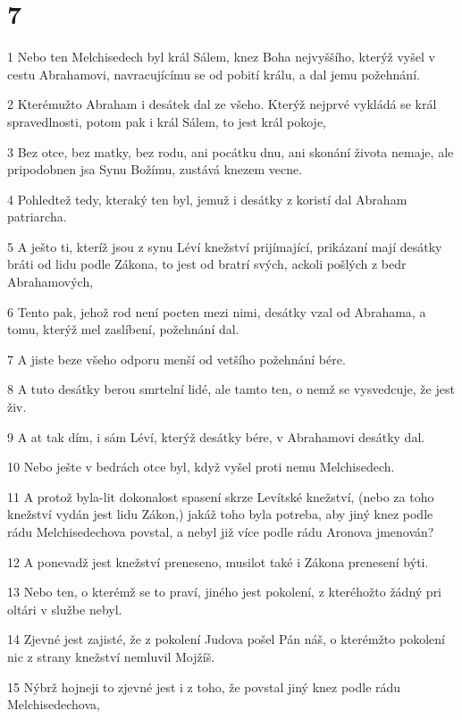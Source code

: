\chapter{7}

\par 1 Nebo ten Melchisedech byl král Sálem, knez Boha nejvyššího, kterýž vyšel v cestu Abrahamovi, navracujícímu se od pobití králu, a dal jemu požehnání.
\par 2 Kterémužto Abraham i desátek dal ze všeho. Kterýž nejprvé vykládá se král spravedlnosti, potom pak i král Sálem, to jest král pokoje,
\par 3 Bez otce, bez matky, bez rodu, ani pocátku dnu, ani skonání života nemaje, ale pripodobnen jsa Synu Božímu, zustává knezem vecne.
\par 4 Pohledtež tedy, kteraký ten byl, jemuž i desátky z koristí dal Abraham patriarcha.
\par 5 A ješto ti, kteríž jsou z synu Léví knežství prijímající, prikázaní mají desátky bráti od lidu podle Zákona, to jest od bratrí svých, ackoli pošlých z bedr Abrahamových,
\par 6 Tento pak, jehož rod není pocten mezi nimi, desátky vzal od Abrahama, a tomu, kterýž mel zaslíbení, požehnání dal.
\par 7 A jiste beze všeho odporu menší od vetšího požehnání bére.
\par 8 A tuto desátky berou smrtelní lidé, ale tamto ten, o nemž se vysvedcuje, že jest živ.
\par 9 A at tak dím, i sám Léví, kterýž desátky bére, v Abrahamovi desátky dal.
\par 10 Nebo ješte v bedrách otce byl, když vyšel proti nemu Melchisedech.
\par 11 A protož byla-lit dokonalost spasení skrze Levítské knežství, (nebo za toho knežství vydán jest lidu Zákon,) jakáž toho byla potreba, aby jiný knez podle rádu Melchisedechova povstal, a nebyl již více podle rádu Aronova jmenován?
\par 12 A ponevadž jest knežství preneseno, musilot také i Zákona prenesení býti.
\par 13 Nebo ten, o kterémž se to praví, jiného jest pokolení, z kteréhožto žádný pri oltári v službe nebyl.
\par 14 Zjevné jest zajisté, že z pokolení Judova pošel Pán náš, o kterémžto pokolení nic z strany knežství nemluvil Mojžíš.
\par 15 Nýbrž hojneji to zjevné jest i z toho, že povstal jiný knez podle rádu Melchisedechova,
